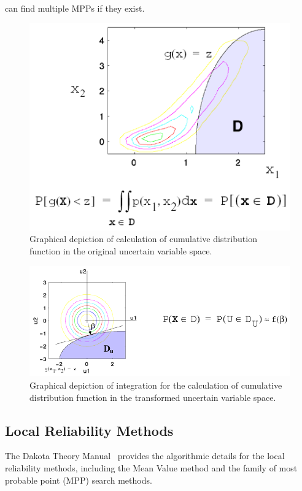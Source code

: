 can find multiple MPPs if they exist.
\begin{figure}[htbp!]
  \centering
  \includegraphics[scale=0.75]{images/cdf_orig_graphic}
  \caption{Graphical depiction of calculation of cumulative
    distribution function in the original uncertain variable space.}
  \label{uq:figure05}
\end{figure}

\begin{figure}[htbp!]
  \centering
  \includegraphics[scale=0.75]{images/cdf_tran_graphic}
  \caption{Graphical depiction of integration for the calculation of
    cumulative distribution function in the transformed uncertain
    variable space.}
  \label{uq:figure06}
\end{figure}

\subsection{Local Reliability Methods}\label{uq:reliability:local}

The Dakota Theory Manual~\cite{TheoMan} provides the algorithmic
details for the local reliability methods, including the Mean Value
method and the family of most probable point (MPP) search methods.


